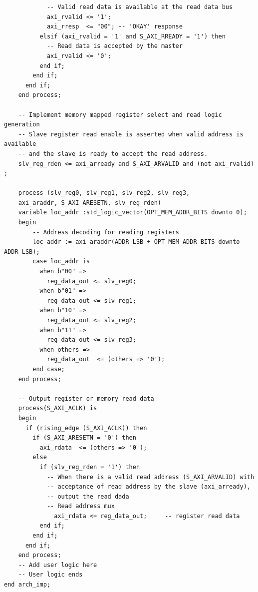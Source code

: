 \documentclass[a4paper,openright,12pt]{report}
\begin{document}
\begin{lstlisting}
	        -- Valid read data is available at the read data bus
	        axi_rvalid <= '1';
	        axi_rresp  <= "00"; -- 'OKAY' response
	      elsif (axi_rvalid = '1' and S_AXI_RREADY = '1') then
	        -- Read data is accepted by the master
	        axi_rvalid <= '0';
	      end if;            
	    end if;
	  end if;
	end process;

	-- Implement memory mapped register select and read logic generation
	-- Slave register read enable is asserted when valid address is available
	-- and the slave is ready to accept the read address.
	slv_reg_rden <= axi_arready and S_AXI_ARVALID and (not axi_rvalid) ;

	process (slv_reg0, slv_reg1, slv_reg2, slv_reg3,
    axi_araddr, S_AXI_ARESETN, slv_reg_rden)
	variable loc_addr :std_logic_vector(OPT_MEM_ADDR_BITS downto 0);
	begin
	    -- Address decoding for reading registers
	    loc_addr := axi_araddr(ADDR_LSB + OPT_MEM_ADDR_BITS downto ADDR_LSB);
	    case loc_addr is
	      when b"00" =>
	        reg_data_out <= slv_reg0;
	      when b"01" =>
	        reg_data_out <= slv_reg1;
	      when b"10" =>
	        reg_data_out <= slv_reg2;
	      when b"11" =>
	        reg_data_out <= slv_reg3;
	      when others =>
	        reg_data_out  <= (others => '0');
	    end case;
	end process; 

	-- Output register or memory read data
	process(S_AXI_ACLK) is
	begin
	  if (rising_edge (S_AXI_ACLK)) then
	    if (S_AXI_ARESETN = '0') then
	      axi_rdata  <= (others => '0');
	    else
	      if (slv_reg_rden = '1') then
	        -- When there is a valid read address (S_AXI_ARVALID) with 
	        -- acceptance of read address by the slave (axi_arready), 
	        -- output the read dada 
	        -- Read address mux
	          axi_rdata <= reg_data_out;     -- register read data
	      end if;   
	    end if;
	  end if;
	end process;
	-- Add user logic here
	-- User logic ends
end arch_imp;

\end{lstlisting}
\end{document}
